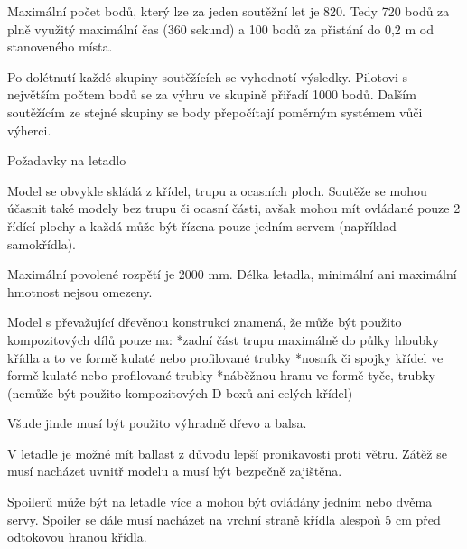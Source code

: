 Maximální počet bodů, který lze za jeden soutěžní let je 820. Tedy 720 bodů za plně využitý maximální čas (360 sekund) a 100 bodů za přistání do 0,2 m od stanoveného místa.

Po dolétnutí každé skupiny soutěžících se vyhodnotí výsledky. Pilotovi s největším počtem bodů se za výhru ve skupině přiřadí 1000 bodů. Dalším soutěžícím ze stejné skupiny se body přepočítají poměrným systémem vůči výherci. 



\secc Požadavky na letadlo

Model se obvykle skládá z křídel, trupu a ocasních ploch. Soutěže se mohou účasnit také modely bez trupu či ocasní části, avšak mohou mít ovládané pouze 2 řídící plochy a každá může být řízena pouze jedním servem (například samokřídla).

Maximální povolené rozpětí je 2000 mm. Délka letadla, minimální ani maximální hmotnost nejsou omezeny.

Model s převažující dřevěnou konstrukcí znamená, že může být použito kompozitových dílů pouze na:
\begitems
*zadní část trupu maximálně do půlky hloubky křídla a to ve formě kulaté nebo profilované trubky 
*nosník či spojky křídel ve formě kulaté nebo profilované trubky 
*náběžnou hranu ve formě tyče, trubky (nemůže být použito kompozitových D-boxů ani celých křídel)
\enditems

Všude jinde musí být použito výhradně dřevo a balsa.

V letadle je možné mít ballast z důvodu lepší pronikavosti proti větru. Zátěž se musí nacházet uvnitř modelu a musí být bezpečně zajištěna.

Spoilerů může být na letadle více a mohou být ovládány jedním nebo dvěma servy. Spoiler se dále musí nacházet na vrchní straně křídla alespoň 5 cm před odtokovou hranou křídla.

